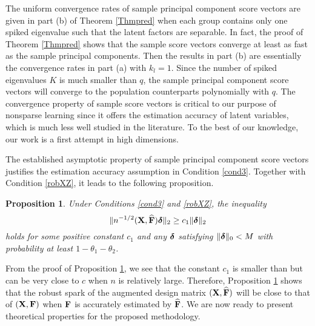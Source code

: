 \documentclass{statsoc}
\newtheorem{proposition}{Proposition}
\newcommand{\bF}{\mbox{\bf F}}
\newcommand{\bX}{\mbox{\bf X}}
\newcommand{\bZ}{\mbox{\bf Z}}
\newcommand{\bdelta}{\mbox{\boldmath $\delta$}}
\begin{document}
The uniform convergence rates of sample principal component score vectors are given in part (b) of Theorem \ref{Thmpred} when each group contains only one spiked eigenvalue such that the latent factors are separable. In fact, the proof of Theorem \ref{Thmpred} shows that the sample score vectors converge at least as fast as the sample principal components. Then the results in part (b) are essentially the convergence rates in part (a) with $k_l = 1$. Since the number of spiked eigenvalues $K$ is much smaller than $q$, the sample principal component score vectors will converge to the population counterparts polynomially with $q$. The convergence property of sample score vectors is critical to our purpose of nonsparse learning since it offers the estimation accuracy of latent variables, which is much less well studied in the literature. To the best of our knowledge, our work is a first attempt in high dimensions.



The established asymptotic property of sample principal component score vectors justifies the estimation accuracy assumption in Condition \ref{cond3}. Together with Condition \ref{robXZ}, it leads to the following proposition.
\begin{proposition} \label{L4}
Under Conditions \ref{cond3} and \ref{robXZ}, the inequality
\[\|n^{-1/2}(\bX, \widehat{\bF}) \bdelta\|_2 \geq c_1 \|\bdelta\|_2\]
holds for some positive constant $c_1$ and any $\bdelta$ satisfying $\|\bdelta\|_0 < M$ with probability at least $1 - \theta_1 - \theta_2$.
\end{proposition}

From the proof of Proposition \ref{L4}, we see that the constant $c_1$ is smaller than but can be very close to $c$ when $n$ is relatively large. Therefore, Proposition \ref{L4} shows that the robust spark of the augmented design matrix $(\bX, \widehat{\bF})$ will be close to that of $(\bX, \bF)$ when $\bF$ is accurately estimated by $\widehat{\bF}$. We are now ready to present theoretical properties for the proposed methodology.
\end{document}
